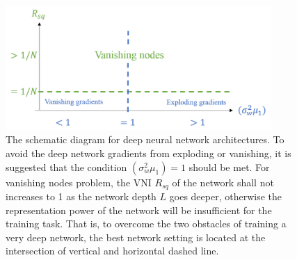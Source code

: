 \begin{figure}
\centering
\includegraphics[width=0.9\textwidth]{theo}
\caption[The schematic diagram for deep neural network architectures]
{The schematic diagram for deep neural network architectures.
To avoid the deep network gradients from exploding or vanishing, it is suggested that the condition 
$(\sigma_w^2\mu_1)=1$ should be met.
For vanishing nodes problem, the VNI $R_{sq}$ of the network shall not increases to 1 as the network
depth $L$ goes deeper, otherwise the representation power of the network will be insufficient for 
the training task.
That is, to overcome the two obstacles of training a very deep network,
the best network setting is located at the intersection of vertical and horizontal dashed line.}
\label{fig:sec6_theo1}
\setlength{\belowcaptionskip}{-10pt}
\end{figure}